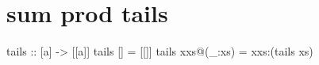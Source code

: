 \section{sum prod tails}
\begin{code}
tails :: [a] -> [[a]]
tails []         = [[]]
tails xxs@(_:xs) = xxs:(tails xs)
\end{code}